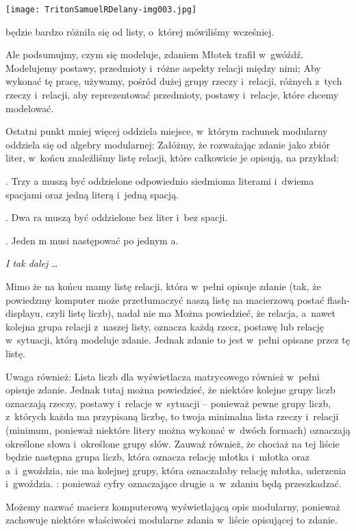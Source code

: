 \documentclass[oneside,polish,11pt,rmheadings]{mwbk}
\begin{document}
 \texttt{[image: TritonSamuelRDelany-img003.jpg]} 


będzie bardzo różniła się od listy, o~której mówiliśmy wcześniej. 

Ale podsumujmy, czym się modeluje, zdaniem Młotek trafił w~gwóźdź. Modelujemy postawy, przedmioty i~różne aspekty relacji między nimi; Aby wykonać tę pracę, używamy, pośród dużej grupy rzeczy i~relacji, różnych z~tych rzeczy i~relacji, aby reprezentować przedmioty, postawy i~relacje, które chcemy modelować. 

Ostatni punkt mniej więcej oddziela miejsce, w~którym rachunek modularny oddziela się od algebry modularnej: Załóżmy, że rozważając zdanie jako zbiór liter, w~końcu znaleźliśmy listę relacji, które całkowicie je opisują, na przykład: 

. Trzy a muszą być oddzielone odpowiednio siedmioma literami i~dwiema spacjami oraz jedną literą i~jedną spacją. 

.  Dwa ra muszą być oddzielone bez liter i~bez spacji. 

. Jeden m musi następować po jednym a. 

\textit{I tak dalej}  \ldots  

Mimo że na końcu mamy listę relacji, która w~pełni opisuje zdanie (tak, że powiedzmy komputer może przetłumaczyć naszą listę na macierzową postać flash-displayu, czyli listę liczb), nadal nie ma Można powiedzieć, że relacja, a~nawet kolejna grupa relacji z~naszej listy, oznacza każdą rzecz, postawę lub relację w~sytuacji, którą modeluje zdanie. Jednak zdanie to jest w~pełni opisane przez tę listę. 

Uwaga również: Lista liczb dla wyświetlacza matrycowego również w~pełni opisuje zdanie. Jednak tutaj można powiedzieć, że niektóre kolejne grupy liczb oznaczają rzeczy, postawy i~relacje w~sytuacji -- ponieważ pewne grupy liczb, z~których każda ma przypisaną liczbę, to twoja minimalna lista rzeczy i~relacji (minimum, ponieważ niektóre litery można wykonać w~dwóch formach) oznaczają określone słowa i~określone grupy słów. Zauważ również, że chociaż na tej liście będzie następna grupa liczb, która oznacza relację młotka i~młotka oraz a~i~gwoździa, nie ma kolejnej grupy, która oznaczałaby relację młotka, uderzenia i~gwoździa. : ponieważ cyfry oznaczające drugie a~w~zdaniu będą przeszkadzać. 

Możemy nazwać macierz komputerową wyświetlającą opis modularny, ponieważ zachowuje niektóre właściwości modularne zdania w~liście opisującej to zdanie. 
\end{document}
